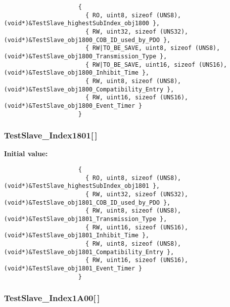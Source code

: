 \begin{Code}\begin{verbatim} 
                     {
                       { RO, uint8, sizeof (UNS8), (void*)&TestSlave_highestSubIndex_obj1800 },
                       { RW, uint32, sizeof (UNS32), (void*)&TestSlave_obj1800_COB_ID_used_by_PDO },
                       { RW|TO_BE_SAVE, uint8, sizeof (UNS8), (void*)&TestSlave_obj1800_Transmission_Type },
                       { RW|TO_BE_SAVE, uint16, sizeof (UNS16), (void*)&TestSlave_obj1800_Inhibit_Time },
                       { RW, uint8, sizeof (UNS8), (void*)&TestSlave_obj1800_Compatibility_Entry },
                       { RW, uint16, sizeof (UNS16), (void*)&TestSlave_obj1800_Event_Timer }
                     }
\end{verbatim}\end{Code}
\subsubsection{ {\bf Test\-Slave\_\-Index1801}[$\,$]}\label{TestSlave_8c_f974884464bdc8ca69752a2211c4af14}


\textbf{Initial value:}

\begin{Code}\begin{verbatim} 
                     {
                       { RO, uint8, sizeof (UNS8), (void*)&TestSlave_highestSubIndex_obj1801 },
                       { RW, uint32, sizeof (UNS32), (void*)&TestSlave_obj1801_COB_ID_used_by_PDO },
                       { RW, uint8, sizeof (UNS8), (void*)&TestSlave_obj1801_Transmission_Type },
                       { RW, uint16, sizeof (UNS16), (void*)&TestSlave_obj1801_Inhibit_Time },
                       { RW, uint8, sizeof (UNS8), (void*)&TestSlave_obj1801_Compatibility_Entry },
                       { RW, uint16, sizeof (UNS16), (void*)&TestSlave_obj1801_Event_Timer }
                     }
\end{verbatim}\end{Code}
\subsubsection{ {\bf Test\-Slave\_\-Index1A00}[$\,$]}\label{TestSlave_8c_92c756cb1b886855fdf0eea14ec090b4}



